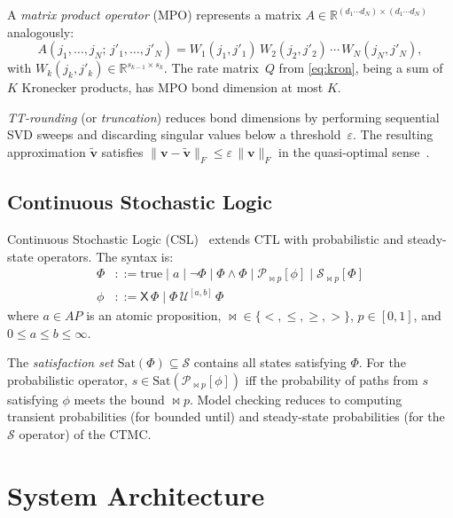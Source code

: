 \documentclass[11pt]{article}
\newcommand{\norm}[1]{\lVert #1 \rVert}
\newcommand{\R}{\mathbb{R}}
\newcommand{\eps}{\varepsilon}
\newcommand{\Sat}{\mathrm{Sat}}
\newcommand{\calS}{\mathcal{S}}
\begin{document}
A \emph{matrix product operator} (MPO) represents a matrix
$A \in \R^{(d_1 \cdots d_N) \times (d_1 \cdots d_N)}$ analogously:
\begin{equation}\label{eq:mpo}
  A(j_1,\ldots,j_N;\, j'_1,\ldots,j'_N)
  = W_1(j_1,j'_1)\,W_2(j_2,j'_2)\,\cdots\,W_N(j_N,j'_N),
\end{equation}
with $W_k(j_k,j'_k) \in \R^{s_{k-1} \times s_k}$.
The rate matrix~$Q$ from \eqref{eq:kron}, being a sum of $K$
Kronecker products, has MPO bond dimension at most $K$.

\emph{TT-rounding} (or \emph{truncation}) reduces bond dimensions by
performing sequential SVD sweeps and discarding singular values below
a threshold~$\eps$.
The resulting approximation $\tilde{\mathbf{v}}$ satisfies
$\norm{\mathbf{v} - \tilde{\mathbf{v}}}_F \leq \eps\, \norm{\mathbf{v}}_F$
in the quasi-optimal sense~\cite{oseledets2011}.

\subsection{Continuous Stochastic Logic}\label{sec:bg:csl}

Continuous Stochastic Logic (CSL)~\cite{aziz2000,baier2003} extends
CTL with probabilistic and steady-state operators.
The syntax is:
\begin{align}
  \Phi &::= \text{true} \mid a \mid \neg\Phi \mid \Phi \wedge \Phi
         \mid \mathcal{P}_{\bowtie p}[\phi]
         \mid \mathcal{S}_{\bowtie p}[\Phi] \\
  \phi &::= \mathsf{X}\,\Phi
         \mid \Phi\,\mathcal{U}^{[a,b]}\,\Phi
\end{align}
where $a \in AP$ is an atomic proposition,
${\bowtie} \in \{<, \leq, \geq, >\}$,
$p \in [0,1]$, and $0 \leq a \leq b \leq \infty$.

The \emph{satisfaction set} $\Sat(\Phi) \subseteq \calS$ contains all
states satisfying $\Phi$.
For the probabilistic operator,
$s \in \Sat(\mathcal{P}_{\bowtie p}[\phi])$ iff the probability of
paths from $s$ satisfying $\phi$ meets the bound $\bowtie p$.
Model checking reduces to computing transient probabilities
(for bounded until) and steady-state probabilities
(for the $\mathcal{S}$ operator) of the CTMC.

\section{System Architecture}\label{sec:architecture}
\end{document}

